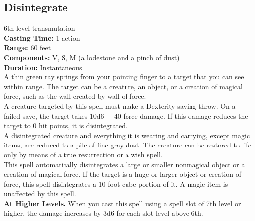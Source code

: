 \documentclass[11pt, A4paper, english]{article}
\begin{document}
		\subsection{Disintegrate}
6th-level transmutation \\
\textbf{Casting Time:} 1 action \\
\textbf{Range:} 60 feet \\
\textbf{Components:} V, S, M (a lodestone and a pinch of dust) \\
\textbf{Duration:} Instantaneous \\
A thin green ray springs from your pointing finger to a target that you can see within range. The target can be a creature, an object, or a creation of magical force, such as the wall created by wall of force. \\
A creature targeted by this spell must make a Dexterity saving throw. On a failed save, the target takes 10d6 + 40 force damage. If this damage reduces the target to 0 hit points, it is disintegrated. \\
A disintegrated creature and everything it is wearing and carrying, except magic items, are reduced to a pile of fine gray dust. The creature can be restored to life only by means of a true resurrection or a wish spell. \\
This spell automatically disintegrates a large or smaller nonmagical object or a creation of magical force. If the target is a huge or larger object or creation of force, this spell disintegrates a  10-foot-cube portion of it. A magic item is unaffected by this spell. \\
\textbf{At Higher Levels.} When you cast this spell using a spell slot of 7th level or higher, the damage increases by 3d6 for each slot level above 6th.
\end{document}
